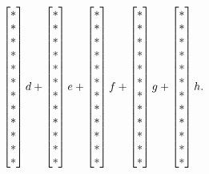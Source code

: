 \begin{problem}
\begin{enumerate}
$$\begin{bmatrix} *\\ *\\ *\\ *\\ *\\ *\\ *\\ *\\ *\\ *\\ *\\ * \end{bmatrix}d+
\begin{bmatrix} *\\ *\\ *\\ *\\ *\\ *\\ *\\ *\\ *\\ *\\ *\\ * \end{bmatrix}e+
\begin{bmatrix} *\\ *\\ *\\ *\\ *\\ *\\ *\\ *\\ *\\ *\\ *\\ * \end{bmatrix}f+
\begin{bmatrix} *\\ *\\ *\\ *\\ *\\ *\\ *\\ *\\ *\\ *\\ *\\ * \end{bmatrix}g+
\begin{bmatrix} *\\ *\\ *\\ *\\ *\\ *\\ *\\ *\\ *\\ *\\ *\\ * \end{bmatrix}h.
$$ 

\end{enumerate}
\end{problem}
